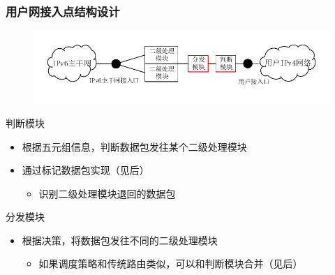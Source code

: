 \documentclass{beamer}
\begin{document}
\begin{frame}
  \frametitle{用户网接入点结构设计}
  \begin{figure}
    \includegraphics[width=\textwidth]{figs/10-user-access-point-b.pdf}
  \end{figure}
  \vspace{-1em}

  \begin{block}{判断模块}
    \begin{itemize}
    \item 根据五元组信息，判断数据包发往某个二级处理模块
    \item 通过标记数据包实现（见后）
      \begin{itemize}
      \item 识别二级处理模块退回的数据包
      \end{itemize}
    \end{itemize}
  \end{block}

  \begin{block}{分发模块}
    \begin{itemize}
    \item 根据决策，将数据包发往不同的二级处理模块
      \begin{itemize}
      \item 如果调度策略和传统路由类似，可以和判断模块合并（见后） 
      \end{itemize}
    \end{itemize}
  \end{block}
\end{frame}
\end{document}
